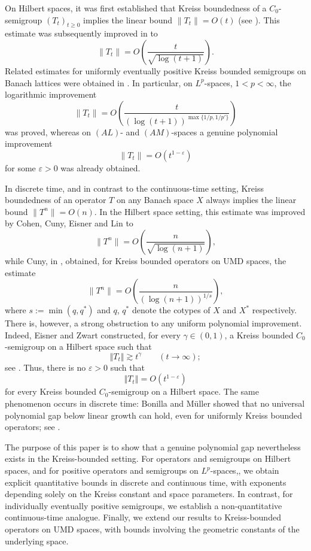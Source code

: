 \documentclass[12pt]{amsart}
\theoremstyle{plain}
\theoremstyle{remark}
\theoremstyle{definition}
\newcommand{\norm}[1]{\left\Vert #1\right\Vert}
\begin{document}
	On Hilbert spaces, it was first established that Kreiss boundedness of a $C_0$-semigroup $(T_t)_{t\ge 0}$ implies the linear bound $
	\|T_t\| = O(t)$ (see \cite{EisnerZwart2006,RozendaalVeraar2018}). This estimate was subsequently improved in \cite{Arnold2022} to
	\[
	\|T_t\|
	=
	O\left(\frac{t}{\sqrt{\log(t+1)}}\right).
	\]
	Related estimates for uniformly eventually positive Kreiss bounded semigroups on Banach
	lattices were obtained in \cite{ArnoldCoine2023}. In particular, on
	$L^p$-spaces, $1<p<\infty$, the logarithmic improvement
	\[
	\|T_t\|
	=
	O\left(
	\frac{t}{(\log(t+1))^{\max\{1/p,1/p'\}}}
	\right)
	\]
	was proved, whereas on $(AL)$- and $(AM)$-spaces a genuine polynomial
	improvement
	\[
	\|T_t\|=O(t^{1-\varepsilon})
	\]
	for some $\varepsilon>0$ was already obtained.
	
	In discrete time, and in contrast to the continuous-time setting, Kreiss boundedness of an operator $T$ on any Banach space $X$ always implies the linear bound $
	\|T^n\| = O(n).$ In the Hilbert space setting, this estimate was improved by Cohen, Cuny, Eisner and Lin \cite{CohenCunyEisnerLin2020} to 
	\[
	\|T^n\| = O\!\left(\frac{n}{\sqrt{\log(n+1)}}\right),
	\]
	while Cuny, in \cite{CunyLp}, obtained, for Kreiss bounded operators on UMD spaces, the estimate
	\[
	\|T^n\| = O\!\left(\frac{n}{(\log(n+1))^{1/s}}\right),
	\]
	where $s := \min(q,q^*)$ and $q$, $q^*$ denote the cotypes of $X$ and $X^*$ respectively.
	There is, however, a strong obstruction to any uniform polynomial improvement. Indeed, Eisner and Zwart constructed, for every $\gamma\in(0,1)$, a Kreiss bounded $C_0$-semigroup on a Hilbert space such that
	\[
	\norm{T_t}\gtrsim t^\gamma
	\qquad (t\to\infty);
	\]
	see \cite[Example 4.4]{EisnerZwart2006}. Thus, there is no $\varepsilon>0$ such that
	\[
	\norm{T_t}=O(t^{1-\varepsilon})
	\]
	for every Kreiss bounded $C_0$-semigroup on a Hilbert space. The same phenomenon occurs in discrete time: Bonilla and M\"uller showed that no universal polynomial gap below linear growth can hold, even for uniformly Kreiss bounded operators; see \cite{BonillaMuller2021}.
	
	The purpose of this paper is to show that a genuine polynomial gap nevertheless exists in the Kreiss-bounded setting. For operators and semigroups on Hilbert spaces, and for positive operators and semigroups on $L^p$-spaces,, we obtain explicit quantitative bounds in discrete and continuous time, with exponents depending solely on the Kreiss constant and space parameters. In contrast, for individually eventually positive semigroups, we establish a non-quantitative continuous-time analogue. Finally, we extend our results to Kreiss-bounded operators on UMD spaces, with bounds involving the geometric constants of the underlying space.
	
\end{document}
